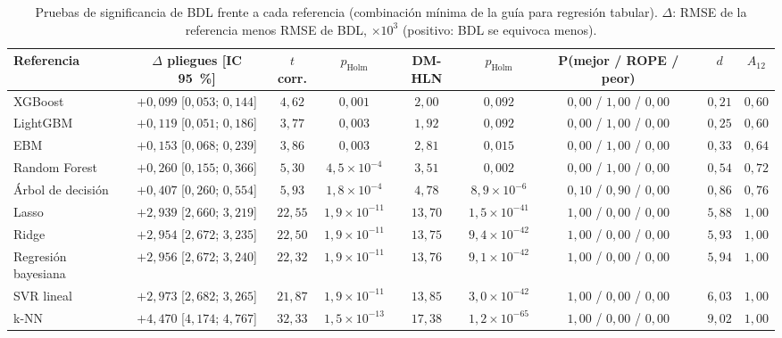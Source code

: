 \begin{table}[tbp]
  \centering\scriptsize\setlength{\tabcolsep}{1.8pt}
  \caption{Pruebas de significancia de BDL frente a cada referencia (combinación mínima de la guía para regresión tabular). $\Delta$: RMSE de la referencia menos RMSE de BDL, $\times 10^{3}$ (positivo: BDL se equivoca menos).}
  \label{tab:pruebas}
  \begin{tabular}{lcccccccc}
    \toprule
    Referencia & $\Delta$ pliegues [IC 95~\%] & $t$ corr. & $p_{\mathrm{Holm}}$ & DM-HLN & $p_{\mathrm{Holm}}$ & P(mejor / ROPE / peor) & $d$ & $A_{12}$ \\
    \midrule
    XGBoost & $+0{,}099$ [$0{,}053$; $0{,}144$] & $4{,}62$ & $0{,}001$ & $2{,}00$ & $0{,}092$ & $0{,}00$ / $1{,}00$ / $0{,}00$ & $0{,}21$ & $0{,}60$ \\
    LightGBM & $+0{,}119$ [$0{,}051$; $0{,}186$] & $3{,}77$ & $0{,}003$ & $1{,}92$ & $0{,}092$ & $0{,}00$ / $1{,}00$ / $0{,}00$ & $0{,}25$ & $0{,}60$ \\
    EBM & $+0{,}153$ [$0{,}068$; $0{,}239$] & $3{,}86$ & $0{,}003$ & $2{,}81$ & $0{,}015$ & $0{,}00$ / $1{,}00$ / $0{,}00$ & $0{,}33$ & $0{,}64$ \\
    Random Forest & $+0{,}260$ [$0{,}155$; $0{,}366$] & $5{,}30$ & $4{,}5 \times 10^{-4}$ & $3{,}51$ & $0{,}002$ & $0{,}00$ / $1{,}00$ / $0{,}00$ & $0{,}54$ & $0{,}72$ \\
    Árbol de decisión & $+0{,}407$ [$0{,}260$; $0{,}554$] & $5{,}93$ & $1{,}8 \times 10^{-4}$ & $4{,}78$ & $8{,}9 \times 10^{-6}$ & $0{,}10$ / $0{,}90$ / $0{,}00$ & $0{,}86$ & $0{,}76$ \\
    Lasso & $+2{,}939$ [$2{,}660$; $3{,}219$] & $22{,}55$ & $1{,}9 \times 10^{-11}$ & $13{,}70$ & $1{,}5 \times 10^{-41}$ & $1{,}00$ / $0{,}00$ / $0{,}00$ & $5{,}88$ & $1{,}00$ \\
    Ridge & $+2{,}954$ [$2{,}672$; $3{,}235$] & $22{,}50$ & $1{,}9 \times 10^{-11}$ & $13{,}75$ & $9{,}4 \times 10^{-42}$ & $1{,}00$ / $0{,}00$ / $0{,}00$ & $5{,}93$ & $1{,}00$ \\
    Regresión bayesiana & $+2{,}956$ [$2{,}672$; $3{,}240$] & $22{,}32$ & $1{,}9 \times 10^{-11}$ & $13{,}76$ & $9{,}1 \times 10^{-42}$ & $1{,}00$ / $0{,}00$ / $0{,}00$ & $5{,}94$ & $1{,}00$ \\
    SVR lineal & $+2{,}973$ [$2{,}682$; $3{,}265$] & $21{,}87$ & $1{,}9 \times 10^{-11}$ & $13{,}85$ & $3{,}0 \times 10^{-42}$ & $1{,}00$ / $0{,}00$ / $0{,}00$ & $6{,}03$ & $1{,}00$ \\
    k-NN & $+4{,}470$ [$4{,}174$; $4{,}767$] & $32{,}33$ & $1{,}5 \times 10^{-13}$ & $17{,}38$ & $1{,}2 \times 10^{-65}$ & $1{,}00$ / $0{,}00$ / $0{,}00$ & $9{,}02$ & $1{,}00$ \\

\end{tabular}
\end{table}
